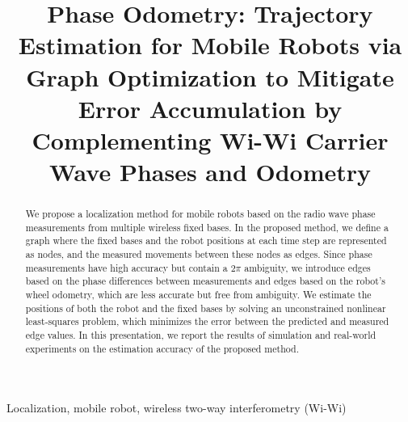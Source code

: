 \documentclass[conference]{IEEEtran}
\begin{document}
\title{Phase Odometry: Trajectory Estimation for Mobile Robots via Graph Optimization to Mitigate Error Accumulation by Complementing Wi-Wi Carrier Wave Phases and Odometry}

\author{
}

\maketitle

\begin{abstract}
We propose a localization method for mobile robots based on the radio wave phase measurements from multiple wireless fixed bases.
In the proposed method, we define a graph where the fixed bases and the robot positions at each time step are represented as nodes, and the measured movements between these nodes as edges.
Since phase measurements have high accuracy but contain a $2\pi$ ambiguity, we introduce edges based on the phase differences between measurements and edges based on the robot's wheel odometry, which are less accurate but free from ambiguity.
We estimate the positions of both the robot and the fixed bases by solving an unconstrained nonlinear least-squares problem, which minimizes the error between the predicted and measured edge values.
In this presentation, we report the results of simulation and real-world experiments on the estimation accuracy of the proposed method.
\end{abstract}

\begin{IEEEkeywords}
Localization, mobile robot, wireless two-way interferometry (Wi-Wi)
\end{IEEEkeywords}
\end{document}
